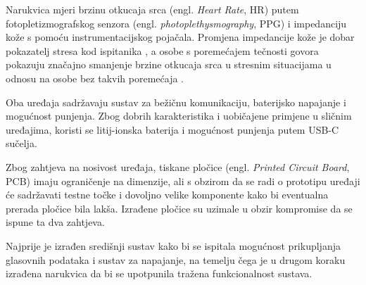 Narukvica mjeri brzinu otkucaja srca (engl. \textit{Heart Rate}, HR) putem fotopletizmografskog senzora (engl. \textit{photoplethysmography}, PPG) i impedanciju kože s pomoću instrumentacijskog pojačala. Promjena impedancije kože je dobar pokazatelj stresa kod ispitanika \cite{edr}, a osobe s poremećajem tečnosti govora pokazuju značajno smanjenje brzine otkucaja srca u stresnim situacijama u odnosu na osobe bez takvih poremećaja \cite{ALM2004123}.

Oba uređaja sadržavaju sustav za bežičnu komunikaciju, baterijsko napajanje i mogućnost punjenja. Zbog dobrih karakteristika i uobičajene primjene u sličnim uređajima, koristi se litij-ionska baterija i mogućnost punjenja putem USB-C sučelja.

Zbog zahtjeva na nosivost uređaja, tiskane pločice (engl. \textit{Printed Circuit Board}, PCB) imaju ograničenje na dimenzije, ali s obzirom  da se radi o prototipu uređaji će sadržavati testne točke i dovoljno velike komponente kako bi eventualna prerada pločice bila lakša. Izrađene pločice su uzimale u obzir kompromise da se ispune ta dva zahtjeva.

Najprije je izrađen središnji sustav kako bi se ispitala mogućnost prikupljanja glasovnih podataka i sustav za napajanje, na temelju čega je u drugom koraku izrađena narukvica da bi se upotpunila tražena funkcionalnost sustava.